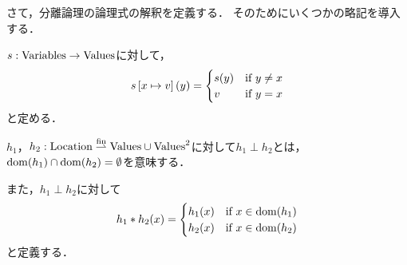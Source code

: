 \documentclass[a4paper, 10pt]{ltjsarticle}
\begin{document}
 さて，分離論理の論理式の解釈を定義する．
 そのためにいくつかの略記を導入する．

 $s:\mathrm{Variables} \to \mathrm{Values} $に対して， 
 \[
  s\left[x \mapsto v\right]\mleft(y\mright)=
   \begin{cases}
    s\mleft(y\mright) &  \text{if $y \neq x$}\\
    v &  \text{if $y=x$}
   \end{cases}
 \]
 と定める．

  $h_1$，$h_2:\mathrm{Location} \mathrel{\overset{\mathrm{fin}}{\rightharpoonup}} \mathrm{Values} \cup \mathrm{Values}^2$に対して$h_1 \perp h_2$とは，
  $\mathdom{h_1} \cap \mathdom{h_2} = \emptyset$を意味する．

  また，$h_1 \perp h_2$に対して
  \[
   h_1 * h_2 \mleft(x\mright)=
   \begin{cases}
    h_1\mleft(x\mright) &  \text{if $x \in \mathdom{h_1}$}\\
    h_2\mleft(x\mright) &  \text{if $x \in \mathdom{h_2}$}
   \end{cases}
  \]
  と定義する．
\end{document}
